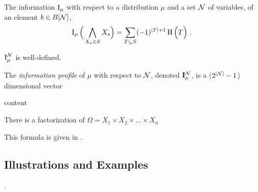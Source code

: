 \documentclass[the-pdg-manual.tex]{subfiles}
\begin{document}
    \begin{defn}
        The information $\operatorname{\mathrm{I}}_\mu$ with respect to a distribution $\mu$ and a set $\mathcal N$ of variables, of an element $b \in B[\mathcal N]$,
    \[          \operatorname{\mathrm{I}}_\mu\Big(\bigwedge_{X_x \in S} X_s\Big) =  \sum_{T \subseteq S} (-1)^{|T|+1} \operatorname{\mathrm{H}}\Big( T \Big) ~. \]
    \end{defn}

    \begin{prop}
        $\operatorname{\mathrm{I}}_\mu^\mathcal N$ is well-defined.
    \end{prop}

    \begin{defn}
        The \emph{information profile} of $\mu$ with respect to $\mathcal N$, denoted $\mathbf I_\mu^\mathcal N$, is a ($2^{|\mathcal N|} -1$) dimensional vector
    \end{defn}

    \begin{example}
        content
    \end{example}



    \begin{prop}
        There is a factorization of $\Omega = X_1 \times X_2 \times \ldots \times X_n$
    \end{prop}

    This formula is given in \cite{}.

    \subsection{Illustrations and Examples}.

\end{document}
